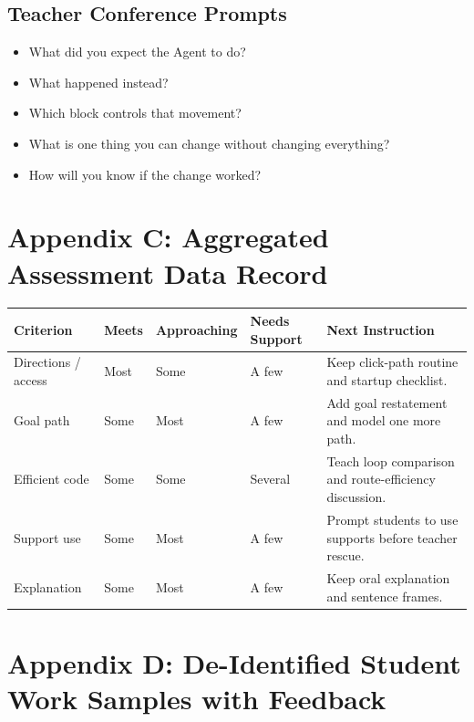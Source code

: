 \documentclass[12pt]{article}
\begin{document}
\subsection{Teacher Conference Prompts}

\begin{itemize}
\item What did you expect the Agent to do?
\item What happened instead?
\item Which block controls that movement?
\item What is one thing you can change without changing everything?
\item How will you know if the change worked?
\end{itemize}

\newpage
\section{Appendix C: Aggregated Assessment Data Record}

\begin{xltabular}{\textwidth}{|P{1.0in}|P{0.8in}|P{1.0in}|P{0.8in}|P{2.4in}|}
\hline
{}\color{white}\bfseries Criterion & \color{white}\bfseries Meets & \color{white}\bfseries Approaching & \color{white}\bfseries Needs Support & \color{white}\bfseries Next Instruction \\
\hline
Directions / access & Most & Some & A few & Keep click-path routine and startup checklist. \\
\hline
{} Goal path & Some & Most & A few & Add goal restatement and model one more path. \\
\hline
Efficient code & Some & Some & Several & Teach loop comparison and route-efficiency discussion. \\
\hline
{} Support use & Some & Most & A few & Prompt students to use supports before teacher rescue. \\
\hline
Explanation & Some & Most & A few & Keep oral explanation and sentence frames. \\
\hline
\end{xltabular}

\section{Appendix D: De-Identified Student Work Samples with Feedback}
\end{document}
